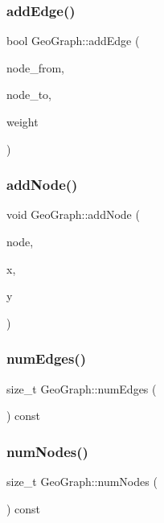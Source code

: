 \subsubsection{\texorpdfstring{addEdge()}{addEdge()}}
{\footnotesize\ttfamily bool Geo\+Graph\+::add\+Edge (\begin{DoxyParamCaption}\item[{int}]{node\+\_\+from,  }\item[{int}]{node\+\_\+to,  }\item[{\mbox{\hyperlink{class_geo_graph_aeab86df7ed72508486bdae447ae14fa7}{Geo\+Graph\+::cost}}}]{weight }\end{DoxyParamCaption})}

\mbox{\label{class_geo_graph_acc7604fb5f8916e33786f6cc4b25b154}} 
\subsubsection{\texorpdfstring{addNode()}{addNode()}}
{\footnotesize\ttfamily void Geo\+Graph\+::add\+Node (\begin{DoxyParamCaption}\item[{int}]{node,  }\item[{float}]{x,  }\item[{float}]{y }\end{DoxyParamCaption})}

\mbox{\label{class_geo_graph_a2689262db53cb66711fd313aa4c6b730}} 
\subsubsection{\texorpdfstring{numEdges()}{numEdges()}}
{\footnotesize\ttfamily size\+\_\+t Geo\+Graph\+::num\+Edges (\begin{DoxyParamCaption}{ }\end{DoxyParamCaption}) const\hspace{0.3cm}{\ttfamily [inline]}}

\mbox{\label{class_geo_graph_aea757f46d2548fbdd8efe5220aa30896}} 
\subsubsection{\texorpdfstring{numNodes()}{numNodes()}}
{\footnotesize\ttfamily size\+\_\+t Geo\+Graph\+::num\+Nodes (\begin{DoxyParamCaption}{ }\end{DoxyParamCaption}) const\hspace{0.3cm}{\ttfamily [inline]}}


